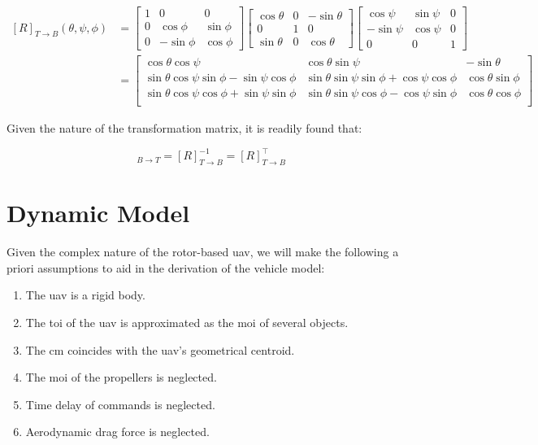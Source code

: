 \begin{equation}
\begin{split}
	[R]_{T \rightarrow B} (\theta, \psi, \phi) &=
	\begin{bmatrix}
		1 & 0 & 0 \\
		0 & \cos\phi & \sin\phi \\
		0 & -\sin\phi & \cos\phi
	\end{bmatrix}
	\begin{bmatrix}
		\cos\theta & 0 & -\sin\theta \\
		0 & 1 & 0 \\
		\sin\theta & 0 & \cos\theta
	\end{bmatrix}
	\begin{bmatrix}
		\cos\psi & \sin\psi & 0 \\
		-\sin\psi & \cos\psi & 0 \\
		0 & 0 & 1
	\end{bmatrix} \\
	&= 
	\begin{bmatrix}
		\cos\theta \cos\psi & \cos\theta \sin\psi & -\sin\theta \\
			\sin\theta \cos\psi \sin\phi - \sin\psi \cos\phi & \sin\theta \sin\psi \sin\phi + \cos\psi \cos\phi & \cos\theta \sin\phi \\
			\sin\theta \cos\psi \cos\phi + \sin\psi \sin\phi & \sin\theta \sin\psi \cos\phi - \cos\psi \sin\phi & \cos\theta \cos\phi \\
	\end{bmatrix}
\end{split}
\end{equation}

Given the nature of the transformation matrix, it is readily found that:

\begin{equation}
	[R]_{B \rightarrow T} = [R]_{T \rightarrow B}^{-1} = [R]_{T \rightarrow B}^\intercal
\end{equation}

\section{Dynamic Model}

Given the complex nature of the rotor-based \gls{uav}, we will make the following a priori assumptions to aid in the derivation of the vehicle model:

\begin{enumerate}[noitemsep]
	\item The \gls{uav} is a rigid body.
	\item The \gls{toi} of the \gls{uav} is approximated as the \gls{moi} of several objects.
	\item The \gls{cm} coincides with the \gls{uav}'s geometrical centroid.
	\item The \gls{moi} of the propellers is neglected.
	\item Time delay of commands is neglected.
	\item Aerodynamic drag force is neglected.
\end{enumerate}

